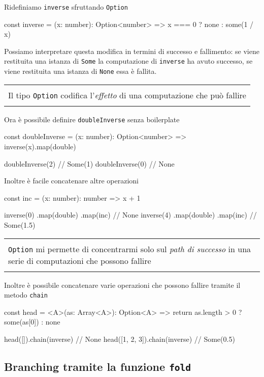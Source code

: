 \documentclass[12pt]{article}
\theoremstyle{definition}
\newenvironment{boxed}
    {\begin{center}
    \begin{tabular}{|p{0.9\textwidth}|}
    \hline\\
    }
    {
    \\\\\hline
    \end{tabular}
    \end{center}
    }
\newenvironment{code}
  {\vspace{0.5cm} \VerbatimEnvironment\begin{typescriptcode}}
  {\end{typescriptcode} \vspace{0.2cm}}
\begin{document}
Ridefiniamo \texttt{inverse} sfruttando \texttt{Option}

\begin{code}
const inverse = (x: number): Option<number> =>
  x === 0 ? none : some(1 / x)
\end{code}

Possiamo interpretare questa modifica in termini di successo e fallimento: se viene restituita una istanza di \texttt{Some}
la computazione di \texttt{inverse} ha avuto successo, se viene restituita una istanza di \texttt{None} essa è fallita.

\begin{boxed}
Il tipo \texttt{Option} codifica l'\emph{effetto} di una computazione che può fallire
\end{boxed}

Ora è possibile definire \texttt{doubleInverse} senza boilerplate

\begin{code}
const doubleInverse = (x: number): Option<number> =>
  inverse(x).map(double)

doubleInverse(2) // Some(1)
doubleInverse(0) // None
\end{code}

Inoltre è facile concatenare altre operazioni

\begin{code}
const inc = (x: number): number => x + 1

inverse(0)
  .map(double)
  .map(inc) // None
inverse(4)
  .map(double)
  .map(inc) // Some(1.5)
\end{code}

\begin{boxed}
\texttt{Option} mi permette di concentrarmi solo sul \emph{path di successo} in una serie di computazioni che possono fallire
\end{boxed}

Inoltre è possibile concatenare varie operazioni che possono fallire tramite il metodo \texttt{chain}

\begin{code}
const head = <A>(as: Array<A>): Option<A> => {
  return as.length > 0 ? some(as[0]) : none
}

head([]).chain(inverse) // None
head([1, 2, 3]).chain(inverse) // Some(0.5)
\end{code}

\subsection{Branching tramite la funzione \texttt{fold}}
\end{document}

